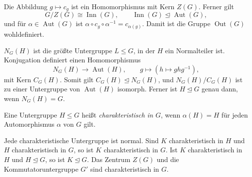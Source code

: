 \begin{theorem}
\label{b40guide:thm:inner-center}
Die Abbildung $g\mapsto c_g$ ist ein Homomorphismus mit Kern $Z(G)$.
Ferner gilt
\[
 G/Z(G)\cong\operatorname{Inn}(G),\qquad
 \operatorname{Inn}(G)\trianglelefteq\operatorname{Aut}(G),
\]
und für $\alpha\in\operatorname{Aut}(G)$ ist
$\alpha\circ c_g\circ\alpha^{-1}=c_{\alpha(g)}$.
Damit ist die Gruppe $\operatorname{Out}(G)$ wohldefiniert.
\cite{milne}
\end{theorem}

\begin{theorem}
\label{b40guide:thm:normalizer-centralizer}
$N_G(H)$ ist die größte Untergruppe $L\leq G$, in der $H$ ein
Normalteiler ist. Konjugation definiert einen Homomorphismus
\[
 N_G(H)\longrightarrow\operatorname{Aut}(H),\qquad
 g\longmapsto (h\mapsto ghg^{-1}),
\]
mit Kern $C_G(H)$. Somit gilt
$C_G(H)\trianglelefteq N_G(H)$, und
$N_G(H)/C_G(H)$ ist zu einer Untergruppe von $\operatorname{Aut}(H)$
isomorph. Ferner ist $H\trianglelefteq G$ genau dann, wenn $N_G(H)=G$.
\cite{milne}
\end{theorem}
\begin{definition}
Eine Untergruppe \(H\leq G\) heißt \emph{charakteristisch in \(G\)},
wenn \(\alpha(H)=H\) für jeden Automorphismus \(\alpha\) von \(G\) gilt.
\end{definition}

\begin{theorem}
Jede charakteristische Untergruppe ist normal.
Sind \(K\) charakteristisch in \(H\) und \(H\) charakteristisch in \(G\),
so ist \(K\) charakteristisch in \(G\).
Ist \(K\) charakteristisch in \(H\) und \(H\trianglelefteq G\),
so ist \(K\trianglelefteq G\).
Das Zentrum \(Z(G)\) und die Kommutatoruntergruppe \(G'\) sind
charakteristisch in \(G\). \cite{milne}
\end{theorem}
